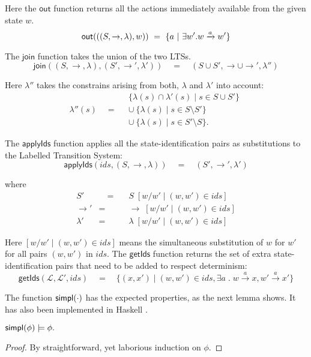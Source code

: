 \NI Here the $\mathsf{out}$ function returns all the actions
immediately available from the given state $w$.
\[
  \mathsf{out}(((S,\rightarrow,\lambda),w)) 
     \ =\  \{ a \ | \  \exists w' . w \xrightarrow{a} w'\} 
\]

\NI The $\mathsf{join}$ function takes the union of the two LTSs.
\[
   \mathsf{join}((S, \rightarrow,\lambda), (S', \rightarrow', \lambda')) 
      \quad=\quad
   (S \cup S', \rightarrow \cup \rightarrow', \lambda'')
\]

\NI Here $\lambda''$ takes the constrains arising from both, $\lambda$ and
$\lambda'$ into account: 
\[
   \lambda''(s) 
      \quad = \quad
   \begin{array}{l}
      \{\lambda(s) \cap \lambda'(s) \; | \; s \in S \cup S'\} \\ \cup \ 
      \{\lambda(s)\; |\; s\in S \setminus S' \} \\ \cup \ 
      \{\lambda(s)\; |\; s\in S' \setminus S \}. 
   \end{array}
\]

\NI The $\mathsf{applyIds}$ function applies all the
state-identification pairs as substitutions to the Labelled Transition
System:
\[
   \mathsf{applyIds}(ids, (S, \rightarrow, \lambda)) 
      \quad=\quad 
   (S', \rightarrow', \lambda')
\]

\NI where
\begin{eqnarray*}
  S' &\quad =\quad & S \; [ w / w' \; | \; (w,w') \in ids] \\
  \rightarrow' & = & \rightarrow \; [ w / w' \; | \; (w,w') \in ids] \\
  \lambda' & = & \lambda \; [ w / w' \; | \; (w,w') \in ids]
\end{eqnarray*}

\NI Here $[ w / w' \; | \; (w,w') \in ids]$ means the simultaneous
substitution of $w$ for $w'$ for all pairs $(w, w')$ in $ids$.  The
$\mathsf{getIds}$ function returns the set of extra
state-identification pairs that need to be added to respect
determinism:
\[
   \mathsf{getIds}(\mathcal{L}, \mathcal{L}', ids) 
      \quad=\quad 
   \{(x,x') \; | \; (w,w') \in ids, \exists a \; . \; w \xrightarrow{a} x, w' \xrightarrow{a} x'\}
\]

\NI The function $\mathsf{simpl}(\cdot)$ has the expected properties, as the next
lemma shows.  It has also been implemented in Haskell
\cite{HaskellImplementation}.

\begin{lemma}
$\mathsf{simpl}(\phi) \models \phi.$
\end{lemma}
\begin{proof}
By straightforward, yet laborious induction on $\phi$.
\end{proof}

